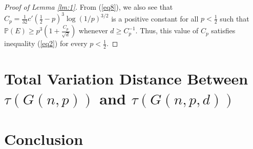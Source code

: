 \documentclass{article}
\begin{document}
\begin{proof}[Proof of Lemma \ref{lm:1}]
From (\ref{eq8}), we also see that $C_p = \frac{1}{32}c'(\frac{1}{2} - p)^3\log(1/p)^{3/2}$ is a positive constant for all $p < \frac{1}{2}$ such that $\mathbb{P}(E) \geq p^3 \left( 1 + \frac{C_p}{\sqrt{d}} \right)$ whenever $d \geq C_p^{-1}$. Thus, this value of $C_p$ satisfies inequality (\ref{eq2}) for every $p < \frac{1}{2}$.

\end{proof}

\section{Total Variation Distance Between $\tau(G(n, p))$ and $\tau(G(n, p, d))$}

\section{Conclusion}



\end{document}
